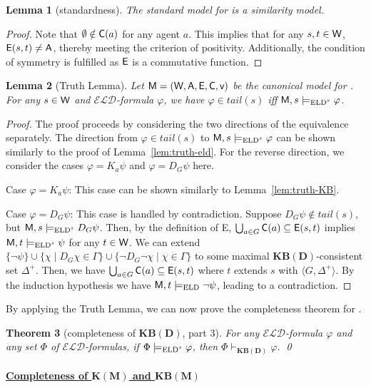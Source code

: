 \documentclass{article}
\newtheorem{theorem}{Theorem}
\newtheorem{lemma}[theorem]{Lemma}%
\newcommand{\CA}{\textnormal{\sf A}\xspace}
\newcommand{\CC}{\textnormal{\sf C}\xspace}
\newcommand{\CE}{\textnormal{\sf E}\xspace}
\newcommand{\CM}{\textnormal{\sf M}\xspace}
\newcommand{\CV}{\textnormal{\sf v}\xspace}
\newcommand{\CW}{\textnormal{\sf W}\xspace}
\renewcommand{\phi}{\varphi}
\newcommand{\langd}{\ensuremath{\mathcal{ELD}}\xspace}
\newcommand{\ld}{\text{\normalfont ELD}\xspace}
\newcommand{\lsd}{\text{\normalfont ELD$^s$}\xspace}
\newcommand{\KM}{\ensuremath{\mathbf{K(M)}}\xspace}
\newcommand{\KBD}{\ensuremath{\mathbf{KB(D)}}\xspace}
\newcommand{\KBM}{\ensuremath{\mathbf{KB(M)}}\xspace}
\begin{document}
\begin{lemma}[standardness]
The standard model for \lsd is a similarity model.
\end{lemma}
\begin{proof}
Note that $\emptyset \notin \CC(a)$ for any agent $a$. This implies that for any $s,t \in \CW$, $\CE(s,t) \neq \CA$, thereby meeting the criterion of positivity. Additionally, the condition of symmetry is fulfilled as $\CE$ is a commutative function.
\end{proof}

\begin{lemma}[Truth Lemma]
Let $\CM = (\CW,\CA,\CE,\CC,\CV)$ be the canonical model for \lsd. For any $s \in \CW$ and \langd-formula $\phi$, we have $\phi \in tail(s)$ iff $\CM,s \models_{\lsd} \phi$.
\end{lemma}
\begin{proof}
The proof proceeds by considering the two directions of the equivalence separately. The direction from $\phi \in tail(s)$ to $\CM,s\models_\lsd \phi$ can be shown similarly to the proof of Lemma~\ref{lem:truth-eld}. For the reverse direction, we consider the cases $\phi = K_a\psi$ and $\phi=D_G\psi$ here.

Case $\phi=K_a\psi$: This case can be shown similarly to Lemma~\ref{lem:truth-KB}.

Case $\phi = D_G\psi$: This case is handled by contradiction.
%
Suppose $D_G\psi\notin tail(s)$, but $\CM,s\models_\lsd D_G\psi$. Then, by the definition of \CE, $\bigcup_{a\in G}\CC(a)\subseteq \CE (s,t)$ implies $\CM,t\models_\lsd \psi$ for any $t\in \CW$. We can extend $\{\neg\psi\}\cup\{\chi\mid D_G\chi\in\Gamma\}\cup\{\neg D_G\neg\chi\mid \chi\in\Gamma\}$ to some maximal \KBD-consistent set $\Delta^+$. Then, we have $\bigcup_{a\in G}\CC(a)\subseteq \CE(s,t)$ where $t$ extends $s$ with $\langle G,\Delta^+\rangle$. By the induction hypothesis we have $\CM,t\models_\ld \neg\psi$, leading to a contradiction.
\end{proof}

By applying the Truth Lemma, we can now prove the completeness theorem for \lsd.

\begin{theorem}[completeness of \KBD, part 3]
\label{thm:completeness3}
For any \langd-formula $\phi$ and any set $\Phi$ of \langd-formulas, if $\Phi \models_\lsd \phi$, then $\Phi \vdash_\KBD \phi$.
\qed
\end{theorem}

\paragraph{\underline{Completeness of \KM and \KBM}}
\end{document}
